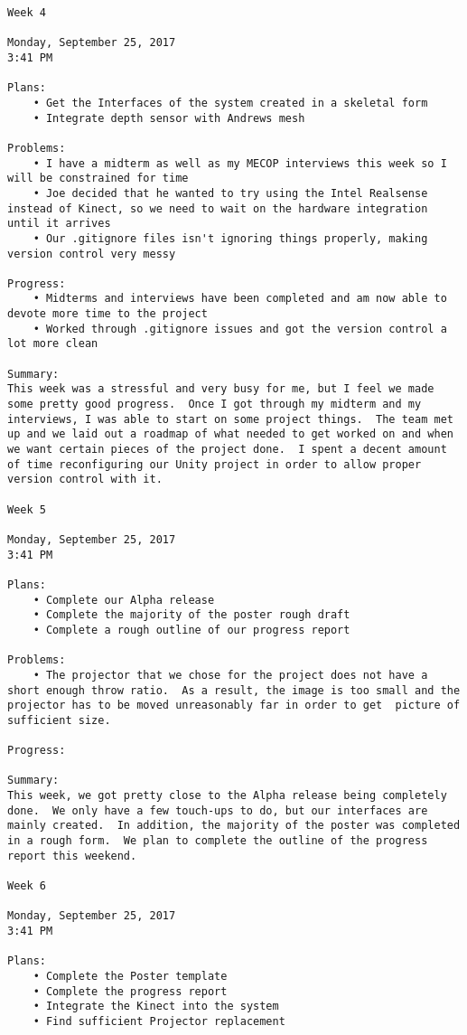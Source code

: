 \begin{lstlisting}
Week 4

Monday, September 25, 2017
3:41 PM

Plans:
	• Get the Interfaces of the system created in a skeletal form
	• Integrate depth sensor with Andrews mesh

Problems:
	• I have a midterm as well as my MECOP interviews this week so I will be constrained for time
	• Joe decided that he wanted to try using the Intel Realsense instead of Kinect, so we need to wait on the hardware integration until it arrives
	• Our .gitignore files isn't ignoring things properly, making version control very messy

Progress:
	• Midterms and interviews have been completed and am now able to devote more time to the project
	• Worked through .gitignore issues and got the version control a lot more clean

Summary:
This week was a stressful and very busy for me, but I feel we made some pretty good progress.  Once I got through my midterm and my interviews, I was able to start on some project things.  The team met up and we laid out a roadmap of what needed to get worked on and when we want certain pieces of the project done.  I spent a decent amount of time reconfiguring our Unity project in order to allow proper version control with it.

Week 5

Monday, September 25, 2017
3:41 PM

Plans:
	• Complete our Alpha release
	• Complete the majority of the poster rough draft
	• Complete a rough outline of our progress report

Problems:
	• The projector that we chose for the project does not have a short enough throw ratio.  As a result, the image is too small and the projector has to be moved unreasonably far in order to get  picture of sufficient size.

Progress:

Summary:
This week, we got pretty close to the Alpha release being completely done.  We only have a few touch-ups to do, but our interfaces are mainly created.  In addition, the majority of the poster was completed in a rough form.  We plan to complete the outline of the progress report this weekend.

Week 6

Monday, September 25, 2017
3:41 PM

Plans:
	• Complete the Poster template
	• Complete the progress report
	• Integrate the Kinect into the system
	• Find sufficient Projector replacement


\end{lstlisting}
